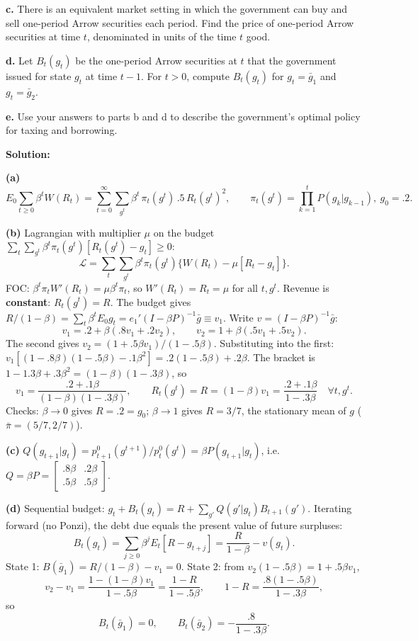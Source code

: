 \documentclass[12pt, letterpaper]{article}
\begin{document}
\begin{tcolorbox}[evenbox,title={Exercise 8.8 \quad Optimal taxation}]
\begin{tcolorbox}[questionbox]
\textbf{c.} There is an equivalent market setting in which the government can buy and sell one-period Arrow
securities each period. Find the price of one-period Arrow securities at time $t$, denominated in units of
the time $t$ good.

\textbf{d.} Let $B_t(g_t)$ be the one-period Arrow securities at $t$ that the government issued for state
$g_t$ at time $t-1$. For $t>0$, compute $B_t(g_t)$ for $g_t=\bar g_1$ and $g_t=\bar g_2$.

\textbf{e.} Use your answers to parts b and d to describe the government's optimal policy for taxing and
borrowing.
\end{tcolorbox}

\textbf{Solution:}

\textbf{(a)}
\[
E_0\sum_{t\ge0}\beta^tW(R_t)=\sum_{t=0}^\infty\sum_{g^t}\beta^t\,\pi_t(g^t)\,.5\,R_t(g^t)^2,\qquad
\pi_t(g^t)=\prod_{k=1}^tP(g_k|g_{k-1}),\ g_0=.2 .
\]

\textbf{(b)} Lagrangian with multiplier $\mu$ on the budget
$\sum_t\sum_{g^t}\beta^t\pi_t(g^t)[R_t(g^t)-g_t]\ge0$:
\[
\mathcal L=\sum_t\sum_{g^t}\beta^t\pi_t(g^t)\big\{W(R_t)-\mu[R_t-g_t]\big\}.
\]
FOC: $\beta^t\pi_tW'(R_t)=\mu\beta^t\pi_t$, so $W'(R_t)=R_t=\mu$ for all $t,g^t$. Revenue is \textbf{constant}:
$R_t(g^t)=R$. The budget gives $R/(1-\beta)=\sum_t\beta^tE_0g_t=e_1'(I-\beta P)^{-1}\bar g\equiv v_1$. Write
$v=(I-\beta P)^{-1}\bar g$:
\[
v_1=.2+\beta(.8v_1+.2v_2),\qquad v_2=1+\beta(.5v_1+.5v_2).
\]
The second gives $v_2=(1+.5\beta v_1)/(1-.5\beta)$. Substituting into the first:
$v_1[(1-.8\beta)(1-.5\beta)-.1\beta^2]=.2(1-.5\beta)+.2\beta$. The bracket is
$1-1.3\beta+.3\beta^2=(1-\beta)(1-.3\beta)$, so
\[
v_1=\frac{.2+.1\beta}{(1-\beta)(1-.3\beta)},\qquad\boxed{R_t(g^t)=R=(1-\beta)v_1=\frac{.2+.1\beta}{1-.3\beta}\quad\forall t,g^t.}
\]
Checks: $\beta\to0$ gives $R=.2=g_0$; $\beta\to1$ gives $R=3/7$, the stationary mean of $g$ ($\bar\pi=(5/7,2/7)$).

\textbf{(c)} $Q(g_{t+1}|g_t)=p^0_{t+1}(g^{t+1})/p^0_t(g^t)=\beta P(g_{t+1}|g_t)$, i.e.\
$Q=\beta P=\begin{bmatrix}.8\beta&.2\beta\\.5\beta&.5\beta\end{bmatrix}$.

\textbf{(d)} Sequential budget: $g_t+B_t(g_t)=R+\sum_{g'}Q(g'|g_t)B_{t+1}(g')$. Iterating forward (no Ponzi),
the debt due equals the present value of future surpluses:
\[
B_t(g_t)=\sum_{j\ge0}\beta^jE_t[R-g_{t+j}]=\frac{R}{1-\beta}-v(g_t).
\]
State 1: $B(\bar g_1)=R/(1-\beta)-v_1=0$. State 2: from $v_2(1-.5\beta)=1+.5\beta v_1$,
\[
v_2-v_1=\frac{1-(1-\beta)v_1}{1-.5\beta}=\frac{1-R}{1-.5\beta},\qquad1-R=\frac{.8(1-.5\beta)}{1-.3\beta},
\]
so
\[
\boxed{B_t(\bar g_1)=0,\qquad B_t(\bar g_2)=-\frac{.8}{1-.3\beta}.}
\]


\end{tcolorbox}
\end{document}
